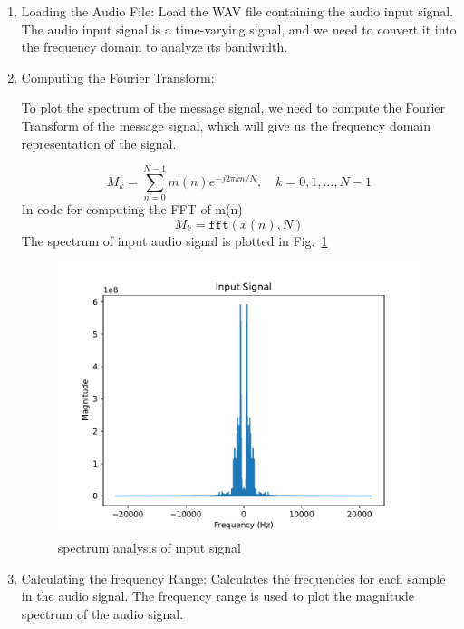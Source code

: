 \documentclass[journal,5pt,twocolumn]{IEEEtran}
\newcommand\figref{Fig.~\ref}
\begin{document}
\begin{enumerate}
\item Loading the Audio File:  Load the WAV file containing the audio input signal.
The audio input signal is a time-varying signal, and we need to convert it into the frequency domain to analyze its bandwidth.



\item Computing the Fourier Transform:

To plot the spectrum of the message signal, we need to compute the Fourier Transform of the message signal, which will give us the frequency domain representation of the signal.

\begin{equation}
M_k = \sum_{n=0}^{N-1} m(n) e^{-j2\pi kn/N}, \quad k=0,1,\dots,N-1
\end{equation}
In code for computing the FFT of m(n)
\begin{equation}
M_k = \texttt{fft}(x(n), N)
\end{equation}
The spectrum of input audio signal is plotted in \figref{fig:input_spectrum}
\begin{figure}
\centering 
\includegraphics[width=\columnwidth]{./inputs.pdf}
\caption{spectrum analysis of input signal}
\label{fig:input_spectrum}
\end{figure}

\item Calculating the frequency Range: Calculates the frequencies for each sample in the audio signal. The frequency range is used to plot the magnitude spectrum of the audio signal.


\end{enumerate}
\end{document}
